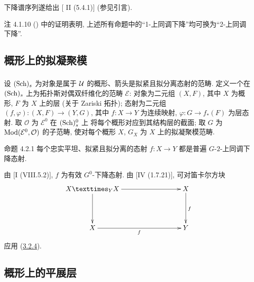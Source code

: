 下降谱序列遂给出 [\cite{sga4.exp.Vbis.bib.5} II (5.4.1)] (参见引言).

\begin{enonce*}[remark]{注 4.1.10}
() 中的证明表明,
上述所有命题中的“1-上同调下降”均可换为“2-上同调下降”.
\end{enonce*}

\subsection{概形上的拟凝聚模}

\setcounter{subsubsection}{-1}



\subsubsection{}
设 $(\operatorname{Sch})_s$ 为对象是属于 ${\mathcal U}$ 的概形、箭头是拟紧且拟分离态射的范畴.
定义一个在 $(\operatorname{Sch})_s$ 上为拓扑斯对偶双纤维化的范畴 $\mathcal{E}$:
对象为二元组 $(X,F)$, 其中 $X$ 为概形, $F$ 为 $X$ 上的层 (关于 Zariski 拓扑);
态射为二元组 $(f,\varphi):(X,F)\to(Y,G)$,
其中 $f:X\to Y$ 为连续映射, $\varphi:G\to f_{\ast}(F)$ 为层态射.
取 $\mathcal{O}$ 为 $\mathcal{E}^0$ 在 $(\operatorname{Sch})^0_s$ 上
将每个概形对应到其结构层的截面;
取 $G$ 为 $\Ysheaf{\Mod}(\mathcal{E}^0,\mathcal{O})$ 的子范畴,
使对每个概形 $X$, $G_X$ 为 $X$ 上的拟凝聚模范畴.

\begin{enonce*}{命题 4.2.1}
每个忠实平坦、拟紧且拟分离的态射 $f:X\to Y$ 都是普遍 $G$-$2$-上同调下降态射.
\end{enonce*}

由 [\SGA I (VIII.5.2)], $f$ 为有效 $G^0$-下降态射.
由 [\EGA IV (1.7.21)], 可对笛卡尔方块
\[
\xymatrix@C=3cm@R=1.5cm{
  \fprod{X}{X}{Y} \ar[r] \ar[d]& X \ar[d]^{f}\\
X   \ar[r]_{f}            & Y
}
\]
应用 (\hyperref[Vbis.prop3.2.4]{3.2.4}).

\subsection{概形上的平展层}
\pageoriginale

